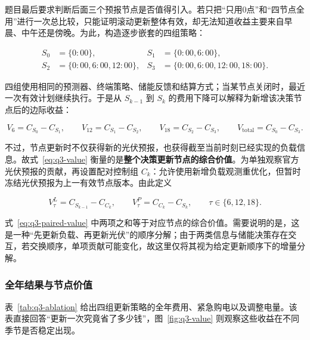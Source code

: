 题目最后要求判断后面三个预报节点是否值得引入。若只把“只用0点”和“四节点全用”进行一次总比较，只能证明滚动更新整体有效，却无法知道收益主要来自早晨、中午还是傍晚。为此，构造逐步嵌套的四组策略：

\begin{equation}
    \begin{aligned}
        S_0&=\{0{:}00\}, & S_1&=\{0{:}00,6{:}00\},\\
        S_2&=\{0{:}00,6{:}00,12{:}00\}, &
        S_3&=\{0{:}00,6{:}00,12{:}00,18{:}00\}.
    \end{aligned}
    \label{eq:q3-nodes}
\end{equation}

四组使用相同的预测器、终端策略、储能反馈和结算方式；当某节点关闭时，最近一次有效计划继续执行。于是从 $S_{k-1}$ 到 $S_k$ 的费用下降可以解释为新增该决策节点后的边际收益：

\begin{equation}
    V_6=C_{S_0}-C_{S_1},\qquad
    V_{12}=C_{S_1}-C_{S_2},\qquad
    V_{18}=C_{S_2}-C_{S_3},\qquad
    V_{\text{total}}=C_{S_0}-C_{S_3}.
    \label{eq:q3-value}
\end{equation}

不过，节点更新时不仅获得新的光伏预报，也获得截至当前时刻已经实现的负载信息。故式~\eqref{eq:q3-value} 衡量的是\textbf{整个决策更新节点的综合价值}。为单独观察官方光伏预报的贡献，再设置配对控制组 $C_k$：允许使用新增负载观测重优化，但暂时冻结光伏预报为上一有效节点版本。由此定义

\begin{equation}
    V^L_{\tau}=C_{S_{k-1}}-C_{C_k},\qquad
    V^P_{\tau}=C_{C_k}-C_{S_k},\qquad \tau\in\{6,12,18\}.
    \label{eq:q3-paired-value}
\end{equation}

式~\eqref{eq:q3-paired-value} 中两项之和等于对应节点的综合价值。需要说明的是，这是一种“先更新负载、再更新光伏”的顺序分解；由于两类信息与储能决策存在交互，若交换顺序，单项贡献可能变化，故这里仅将其视为给定更新顺序下的增量分解。

\subsubsection{全年结果与节点价值}

表~\ref{tab:q3-ablation} 给出四组更新策略的全年费用、紧急购电以及调整电量。该表直接回答“更新一次究竟省了多少钱”，图~\ref{fig:q3-value} 则观察这些收益在不同季节是否稳定出现。

